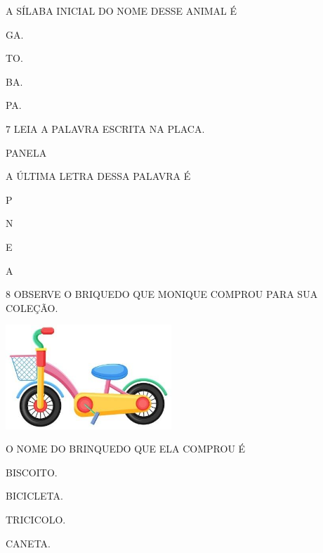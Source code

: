 
A SÍLABA INICIAL DO NOME DESSE ANIMAL É

\begin{escolha}
\item GA.

\item TO.

\item BA.

\item PA.
\end{escolha}

\num{7} LEIA A PALAVRA ESCRITA NA PLACA.

\begin{mdframed}[linewidth=2pt,linecolor=azul!20,backgroundcolor=azul!20,roundcorner=2pt]
PANELA
\end{mdframed}

A ÚLTIMA LETRA DESSA PALAVRA É

\begin{escolha}
\item P

\item N

\item E

\item A
\end{escolha}

\num{8} OBSERVE O BRIQUEDO QUE MONIQUE COMPROU PARA SUA COLEÇÃO.

\includegraphics[width=2.45625in,height=1.54583in]{media/image217.jpg}


O NOME DO BRINQUEDO QUE ELA COMPROU É

\begin{escolha}
\item BISCOITO.

\item BICICLETA.

\item TRICICOLO.

\item CANETA.
\end{escolha}

